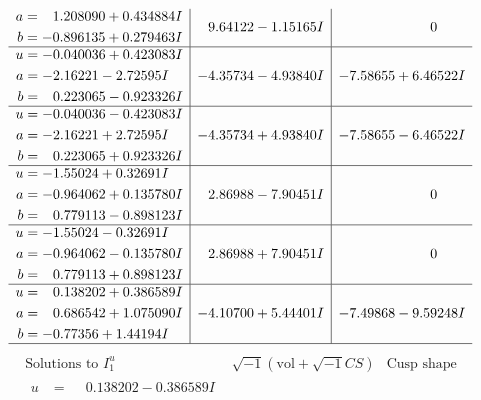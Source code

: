 \documentclass[1p]{elsarticle_modified}
\theoremstyle{definition}
\newcommand{\I}{\sqrt{-1}}
\begin{document}
$$\begin{array}{c|c|c}
\begin{aligned}
a &= \phantom{-}1.208090 + 0.434884 I \\
b &= -0.896135 + 0.279463 I\end{aligned}
 & \phantom{-}9.64122 - 1.15165 I & \phantom{-0.000000 } 0 \\ \hline\begin{aligned}
u &= -0.040036 + 0.423083 I \\
a &= -2.16221 - 2.72595 I \\
b &= \phantom{-}0.223065 - 0.923326 I\end{aligned}
 & -4.35734 - 4.93840 I & -7.58655 + 6.46522 I \\ \hline\begin{aligned}
u &= -0.040036 - 0.423083 I \\
a &= -2.16221 + 2.72595 I \\
b &= \phantom{-}0.223065 + 0.923326 I\end{aligned}
 & -4.35734 + 4.93840 I & -7.58655 - 6.46522 I \\ \hline\begin{aligned}
u &= -1.55024 + 0.32691 I \\
a &= -0.964062 + 0.135780 I \\
b &= \phantom{-}0.779113 - 0.898123 I\end{aligned}
 & \phantom{-}2.86988 - 7.90451 I & \phantom{-0.000000 } 0 \\ \hline\begin{aligned}
u &= -1.55024 - 0.32691 I \\
a &= -0.964062 - 0.135780 I \\
b &= \phantom{-}0.779113 + 0.898123 I\end{aligned}
 & \phantom{-}2.86988 + 7.90451 I & \phantom{-0.000000 } 0 \\ \hline\begin{aligned}
u &= \phantom{-}0.138202 + 0.386589 I \\
a &= \phantom{-}0.686542 + 1.075090 I \\
b &= -0.77356 + 1.44194 I\end{aligned}
 & -4.10700 + 5.44401 I & -7.49868 - 9.59248 I\\
 \hline 
 \end{array}$$\newpage$$\begin{array}{c|c|c}  
\text{Solutions to }I^u_{1}& \I (\text{vol} + \sqrt{-1}CS) & \text{Cusp shape}\\
 \hline 
\begin{aligned}
u &= \phantom{-}0.138202 - 0.386589 I \\

\end{aligned}
\end{array}$$
\end{document}
